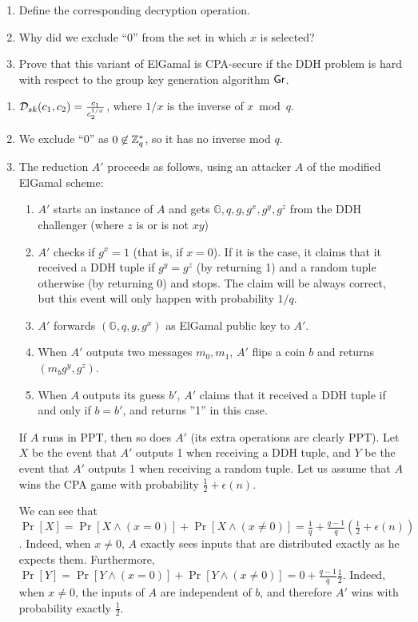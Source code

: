 \begin{enumerate}
	\item Define the corresponding decryption operation. 	
	\item Why did we exclude ``0'' from the set in which $x$ is selected? 	
	\item Prove that this variant of ElGamal is CPA-secure if the DDH
	problem is hard with respect to the group key generation algorithm $\operatorname{\mathsf{Gr}}$. 
\end{enumerate}

\begin{solution}
\begin{enumerate}
	\item	$\mathcal{D}_{sk}(c_1, c_2) = \frac{c_1}{c_2^{1/x}}$, where $1/x$ is the inverse of $x \bmod q$. 
	\item We exclude ``0'' as  $0 \not \in \mathbb{Z}_q^*$, so it has no inverse mod $q$. 
	\item The reduction $A'$ proceeds as follows, using an attacker $A$ of
	the modified ElGamal scheme:
	\begin{enumerate}
		\item $A'$ starts an instance of $A$ and gets
		$\mathbb{G}, q, g, g^x, g^y, g^z$ from the DDH challenger (where $z$
		is or is not $xy$)
		\item $A'$ checks if $g^x = 1$ (that is, if $x=0$). If it is the
		case, it claims that it received a DDH tuple if $g^y = g^z$ (by
		returning 1) and a random tuple otherwise (by returning 0) and
		stops. The claim will be always correct, but this event will only
		happen with probability $1/q$.
		\item $A'$ forwards $(\mathbb{G},q, g, g^x)$ as ElGamal public key
		to $A'$.
		\item When $A'$ outputs two messages $m_0, m_1$, $A'$ flips a coin
		$b$ and returns $(m_b g^y, g^z)$. 
		\item When $A$ outputs its guess $b'$, $A'$ claims that it received
		a DDH tuple if and only if $b = b'$, and returns ''1'' in this case. 
	\end{enumerate}
	If $A$ runs in PPT, then so does $A'$ (its extra operations are
	clearly PPT). 
	Let $X$ be the event that $A'$ outputs 1 when receiving a DDH tuple,
	and $Y$ be the event that $A'$ outputs 1 when receiving a random
	tuple. 
	Let us assume that $A$ wins the CPA
	game with probability $\frac 1 2 + \epsilon(n)$.
	
	We can see that
	$\Pr[X] = \Pr[X \wedge (x=0)] + \Pr[X \wedge (x\neq 0)] = \frac 1 q +
	\frac{q-1}{q}(\frac 1 2 + \epsilon(n))$.
	Indeed, when $x \neq 0$, $A$ exactly sees inputs that are
	distributed exactly as he expects them. Furthermore,
	$\Pr[Y] = \Pr[Y \wedge (x=0)] + \Pr[Y \wedge (x\neq 0)] = 0 +
	\frac{q-1}{q} \frac 1 2$.
	Indeed, when $x \neq 0$, the inputs of $A$ are independent of $b$, and
	therefore $A'$ wins with probability exactly $\frac 1 2$. 
	

\end{enumerate}
\end{solution}
